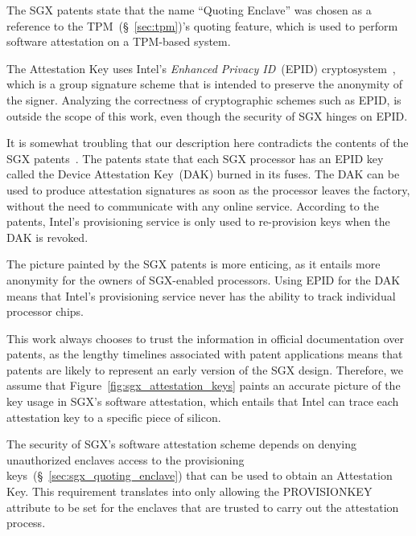 
The SGX patents state that the name ``Quoting Enclave'' was chosen as a
reference to the TPM~(\S~\ref{sec:tpm})'s quoting feature, which is used to
perform software attestation on a TPM-based system.

The Attestation Key uses Intel's \textit{Enhanced Privacy ID}~(EPID)
cryptosystem~\cite{brickell2009epid}, which is a group signature scheme that is
intended to preserve the anonymity of the signer. Analyzing the correctness of
cryptographic schemes such as EPID, is outside the scope of this work, even
though the security of SGX hinges on EPID.

It is somewhat troubling that our description here contradicts the contents of
the SGX patents~\cite{intel2013patent1, intel2013patent2}. The patents state
that each SGX processor has an EPID key called the Device Attestation Key~(DAK)
burned in its fuses. The DAK can be used to produce attestation signatures as
soon as the processor leaves the factory, without the need to communicate with
any online service. According to the patents, Intel's provisioning service is
only used to re-provision keys when the DAK is revoked.

The picture painted by the SGX patents is more enticing, as it entails more
anonymity for the owners of SGX-enabled processors. Using EPID for the DAK
means that Intel's provisioning service never has the ability to track
individual processor chips.

This work always chooses to trust the information in official documentation
over patents, as the lengthy timelines associated with patent applications
means that patents are likely to represent an early version of the SGX design.
Therefore, we assume that Figure~\ref{fig:sgx_attestation_keys} paints an
accurate picture of the key usage in SGX's software attestation, which entails
that Intel can trace each attestation key to a specific piece of silicon.


\label{sec:sgx_launch_enclave}


The security of SGX's software attestation scheme depends on denying
unauthorized enclaves access to the provisioning
keys~(\S~\ref{sec:sgx_quoting_enclave}) that can be used to obtain an
Attestation Key. This requirement translates into only allowing the
PROVISIONKEY attribute to be set for the enclaves that are trusted to carry out
the attestation process.

